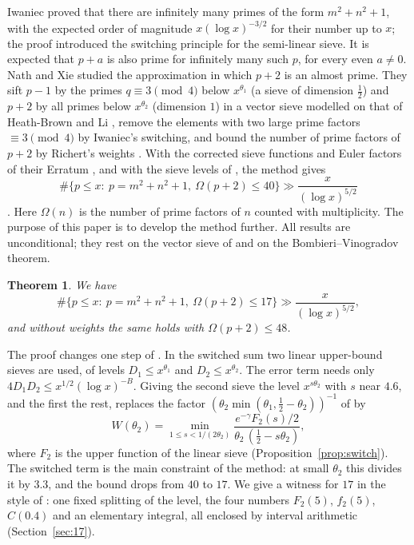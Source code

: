 \documentclass[11pt,a4paper]{amsart}
\newtheorem{theorem}{Theorem}[section]
\theoremstyle{remark}
\numberwithin{equation}{section}
\begin{document}
Iwaniec \cite{Iw72} proved that there are infinitely many primes of the form $m^2+n^2+1$, with the expected order
of magnitude $x(\log x)^{-3/2}$ for their number up to $x$; the proof introduced the switching principle for the
semi-linear sieve. It is expected that $p+a$ is also prime for infinitely many such $p$, for every even
$a\ne0$. Nath and Xie \cite{NX} studied the approximation in which $p+2$ is an almost prime. They sift $p-1$ by
the primes $q\equiv3\pmod4$ below $x^{\theta_1}$ (a sieve of dimension $\frac12$) and $p+2$ by all primes below
$x^{\theta_2}$ (dimension $1$) in a vector sieve modelled on that of Heath-Brown and Li \cite{HBL}, remove the
elements with two large prime factors $\equiv3\pmod 4$ by Iwaniec's switching, and bound the number of prime
factors of $p+2$ by Richert's weights \cite{Richert}. With the corrected sieve functions and Euler factors of
their Erratum \cite{NXerr}, and with the sieve levels of \cite{NX}, the method gives
\[
\#\{p\le x:\ p=m^2+n^2+1,\ \Omega(p+2)\le 40\}\gg\frac{x}{(\log x)^{5/2}}
\]
\cite[Theorem~1]{NXerr}. Here $\Omega(n)$ is the number of prime factors of $n$ counted with multiplicity. The
purpose of this paper is to develop the method further. All results are unconditional; they rest on the
vector sieve of \cite{NX} and on the Bombieri--Vinogradov theorem.

\begin{theorem}\label{thm:17}
We have
\[
\#\{p\le x:\ p=m^2+n^2+1,\ \Omega(p+2)\le 17\}\gg\frac{x}{(\log x)^{5/2}} ,
\]
and without weights the same holds with $\Omega(p+2)\le48$.
\end{theorem}

The proof changes one step of \cite{NX}. In the switched sum two linear upper-bound sieves are used, of levels
$D_1\le x^{\theta_1}$ and $D_2\le x^{\theta_2}$. The error term needs only $4D_1D_2\le x^{1/2}(\log x)^{-B}$. Giving
the second sieve the level $x^{s\theta_2}$ with $s$ near $4.6$, and the first the rest, replaces the factor
$(\theta_2\min(\theta_1,\frac12-\theta_2))^{-1}$ of \cite{NX,NXerr} by
\begin{equation}\label{eq:W}
W(\theta_2)=\min_{1\le s<1/(2\theta_2)}\frac{e^{-\gamma}F_2(s)/2}{\theta_2\,(\frac12-s\theta_2)},
\end{equation}
where $F_2$ is the upper function of the linear sieve (Proposition~\ref{prop:switch}). The switched term is the
main constraint of the method: at small $\theta_2$ this divides it by $3.3$, and the bound drops from $40$ to
$17$. We give a witness for $17$ in the style of \cite{NXerr}: one fixed splitting of the level, the four
numbers $F_2(5)$, $f_2(5)$, $C(0.4)$ and an elementary integral, all enclosed by interval arithmetic
(Section~\ref{sec:17}).
\end{document}
